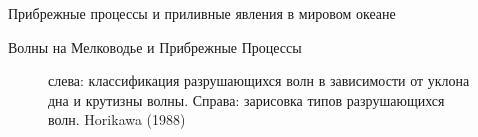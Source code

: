 \begin{chapter}{Прибрежные процессы и приливные явления в мировом океане}
\begin{section}{Волны на Мелководье и Прибрежные Процессы}
\begin{figure}[t!]
\begin{centering}
\end{centering}
\caption{слева: классификация разрушающихся волн в зависимости от
уклона дна и крутизны волны. Справа: зарисовка типов разрушающихся
волн. Horikawa (1988)}
\label{fig:breakers}
\end{figure}
%
%


\end{section}
\end{chapter}
